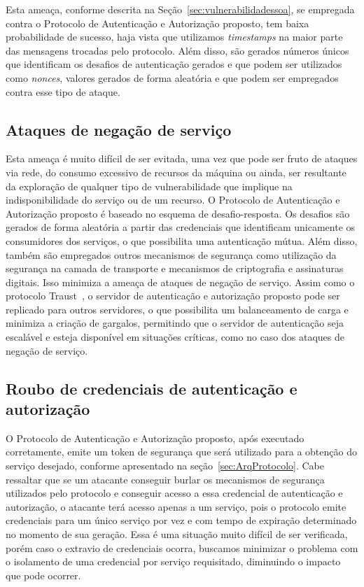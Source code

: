 Esta ameaça, conforme descrita na Seção~\ref{sec:vulnerabilidadessoa}, se empregada contra o Protocolo de Autenticação e Autorização proposto, tem baixa probabilidade de sucesso, haja vista que utilizamos \emph{timestamps} na maior parte das mensagens trocadas pelo protocolo. Além disso, são gerados números únicos que identificam os desafios de autenticação gerados e que podem ser utilizados como \emph{nonces}, valores gerados de forma aleat\'{o}ria e que podem ser empregados contra esse tipo de ataque.

\subsection{Ataques de negação de serviço}

Esta ameaça é muito difícil de ser evitada, uma vez que pode ser fruto de ataques via rede, do consumo excessivo de recursos da máquina  ou ainda, ser resultante da exploração de qualquer tipo de vulnerabilidade que implique na indisponibilidade do serviço ou de um recurso. O Protocolo de Autenticação e Autorização proposto é baseado no esquema de desafio-resposta. Os desafios são gerados de forma aleatória a partir das credenciais que identificam unicamente os consumidores dos serviços, o que possibilita uma autenticação mútua. Além disso, também são empregados outros mecanismos de segurança como utilização da segurança na camada de transporte e mecanismos de criptografia e assinaturas digitais. Isso minimiza a ameaça de ataques de negação de serviço. Assim como o protocolo Traust~\cite{traust08}, o servidor de autenticação e autorização proposto pode ser replicado para outros servidores, o que possibilita um balanceamento de carga e minimiza a criação de gargalos, permitindo que o servidor de autenticação seja escalável e esteja disponível em situações críticas, como no caso dos ataques de negação de serviço.


\subsection{Roubo de credenciais de autenticação e autorização}\label{subsec:RouboCred}

O Protocolo de Autenticação e Autorização proposto, após executado corretamente, emite um token de segurança que será utilizado para a obtenção do serviço desejado, conforme apresentado na seção~\ref{sec:ArqProtocolo}. Cabe ressaltar que se um atacante conseguir burlar os mecanismos de segurança utilizados pelo protocolo e conseguir acesso a essa credencial de autenticação e autorização, o atacante terá acesso apenas a um serviço, pois o protocolo emite credenciais para um único serviço por vez e com tempo de expiração determinado no momento de sua geração. Essa é uma situação muito difícil de ser verificada, porém caso o extravio de credenciais ocorra, buscamos minimizar o problema com o isolamento de uma credencial por serviço requisitado, diminuindo o impacto que pode ocorrer.

